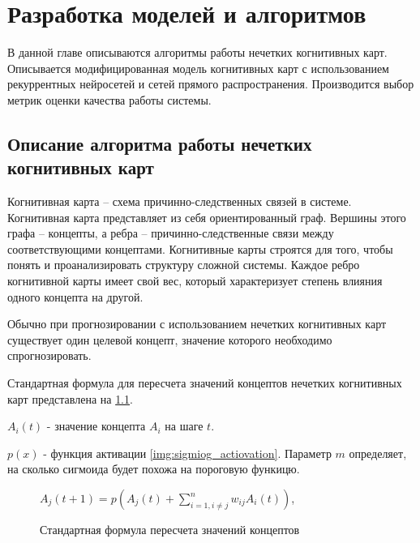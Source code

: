 \chapter{Разработка моделей и алгоритмов}



\begin{annotation}
	В данной главе описываются алгоритмы работы нечетких когнитивных карт.
	Описывается модифицированная модель когнитивных карт с использованием
	рекуррентных нейросетей и сетей прямого распространения.
	Производится выбор метрик оценки качества работы системы.
\end{annotation}

\section{Описание алгоритма работы нечетких когнитивных карт}

Когнитивная карта – схема причинно-следственных связей в системе.
Когнитивная карта представляет из себя ориентированный граф.
Вершины этого графа – концепты, а ребра – причинно-следственные связи между соответствующими концептами.
Когнитивные карты строятся для того, чтобы понять и проанализировать структуру сложной системы.
Каждое ребро когнитивной карты имеет свой вес, который характеризует степень влияния одного концепта на другой.

Обычно при прогнозировании с использованием нечетких когнитивных карт существует один целевой концепт,
значение которого необходимо спрогнозировать.


Стандартная формула для пересчета значений концептов нечетких когнитивных карт представлена на
\ref{img:concepts_recalc}.

$ A_i(t) $ - значение концепта $A_i$ на шаге $t$.

$ p(x) $ - функция активации \ref{img:sigmiog_actiovation}. Параметр $m$ определяет, на сколько сигмоида будет похожа на пороговую функицю.

\def\figurename{Формула}
\begin{figure}[t]
	\centering
	$ A_j(t+1) = p( A_j(t) + \sum_{i = 1, i \neq j}^{n} w_{ij} A_i(t) ) $,
	\caption{Стандартная формула пересчета значений концептов}
	\label{img:concepts_recalc}
\end{figure}
\noindent


